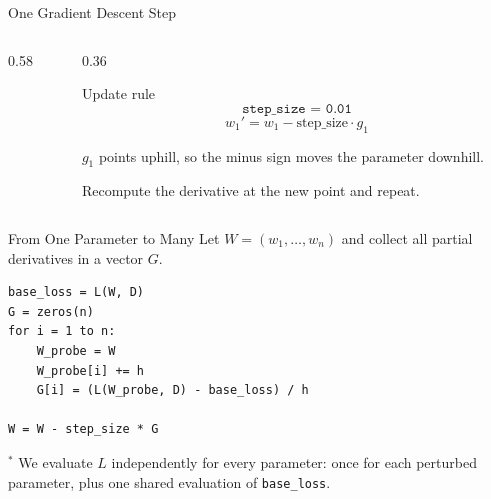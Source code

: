 \documentclass[aspectratio=169]{beamer}
\begin{document}
\begin{frame}{One Gradient Descent Step}
  \begin{columns}[c]
    \begin{column}{0.58\textwidth}
      \centering
    \end{column}
    \begin{column}{0.36\textwidth}
      \begin{block}{Update rule}
        \begin{equation*}
          \texttt{step\_size = 0.01}
        \end{equation*}
        \begin{equation*}
          w_1' = w_1 - \text{step\_size} \cdot g_1
        \end{equation*}
      \end{block}

      $g_1$ points uphill, so the minus sign moves the parameter downhill.

      Recompute the derivative at the new point and repeat.
    \end{column}
  \end{columns}
\end{frame}

\begin{frame}[fragile]{From One Parameter to Many}
  \small
  Let $W = (w_1, \ldots, w_n)$ and collect all partial derivatives in a vector
  $G$.

\begin{verbatim}
base_loss = L(W, D)
G = zeros(n)
for i = 1 to n:
    W_probe = W
    W_probe[i] += h
    G[i] = (L(W_probe, D) - base_loss) / h

W = W - step_size * G
\end{verbatim}

  {\footnotesize
    $^{*}$ We evaluate $L$ independently for every parameter: once for each
    perturbed parameter, plus one shared evaluation of \texttt{base\_loss}.
  }
\end{frame}
\end{document}
